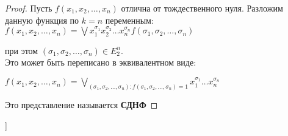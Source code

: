 \begin{proof} 
Пусть $f(x_{1}, x_{2}, \ldots, x_{n})$ отлична от тождественного нуля. Разложим данную функция по $k = n$ переменным: \\
$f(x_{1}, x_{2}, \ldots, x_{n}) = \bigvee x^{\sigma_{1}}_{1}   x^{\sigma_{2}}_{2}   \ldots   x^{\sigma_{n}}_{n} f(\sigma_{1}, \sigma_{2},\ldots,\sigma_{n})$

при этом $(\sigma_{1}, \sigma_{2},\ldots,\sigma_{n}) \in E^n_{2}$.\\

Это может быть переписано в эквивалентном виде:

$f(x_1, x_2, \dots, x_n) = \bigvee_{(\sigma_1, \sigma_2, \dots, \sigma_n): f(\sigma_1, \sigma_2, \dots, \sigma_n) = 1} x_1^{\sigma_1}  \dots  x_n^{\sigma_n}$

Это представление называется \textbf{СДНФ}
\end{proof}





\bigbreak
[\cite[page 69-96]{replace_me}]
